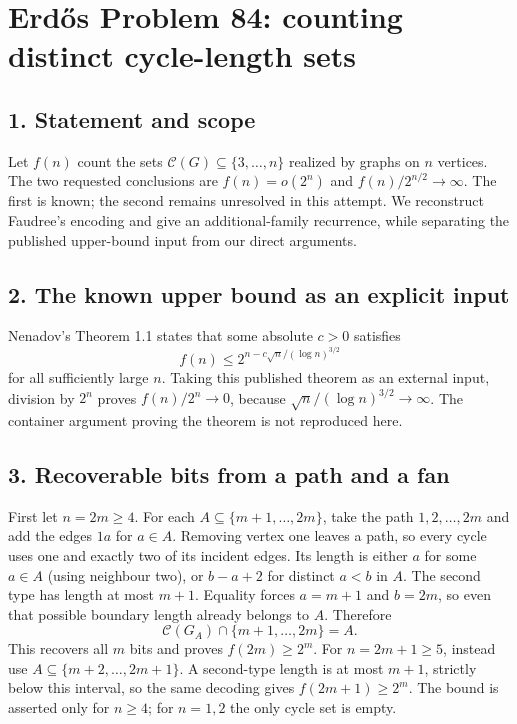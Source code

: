 \section*{Erd\H{o}s Problem 84: counting distinct cycle-length sets}
\subsection*{1. Statement and scope}
Let $f(n)$ count the sets $\mathcal C(G)\subseteq\{3,\ldots,n\}$ realized by graphs on $n$ vertices. The two requested conclusions are $f(n)=o(2^n)$ and $f(n)/2^{n/2}\to\infty$. The first is known; the second remains unresolved in this attempt. We reconstruct Faudree's encoding and give an additional-family recurrence, while separating the published upper-bound input from our direct arguments.

\subsection*{2. The known upper bound as an explicit input}
Nenadov's Theorem 1.1 states that some absolute $c>0$ satisfies
\[
 f(n)\le2^{n-c\sqrt n/(\log n)^{3/2}}
\]
for all sufficiently large $n$. Taking this published theorem as an external input, division by $2^n$ proves $f(n)/2^n\to0$, because $\sqrt n/(\log n)^{3/2}\to\infty$. The container argument proving the theorem is not reproduced here.

\subsection*{3. Recoverable bits from a path and a fan}
First let $n=2m\ge4$. For each $A\subseteq\{m+1,\ldots,2m\}$, take the path $1,2,\ldots,2m$ and add the edges $1a$ for $a\in A$. Removing vertex one leaves a path, so every cycle uses one and exactly two of its incident edges. Its length is either $a$ for some $a\in A$ (using neighbour two), or $b-a+2$ for distinct $a<b$ in $A$.
The second type has length at most $m+1$. Equality forces $a=m+1$ and $b=2m$, so even that possible boundary length already belongs to $A$. Therefore
\[
 \mathcal C(G_A)\cap\{m+1,\ldots,2m\}=A. \tag{1}
\]
This recovers all $m$ bits and proves $f(2m)\ge2^m$.
For $n=2m+1\ge5$, instead use $A\subseteq\{m+2,\ldots,2m+1\}$. A second-type length is at most $m+1$, strictly below this interval, so the same decoding gives $f(2m+1)\ge2^m$. The bound is asserted only for $n\ge4$; for $n=1,2$ the only cycle set is empty.

